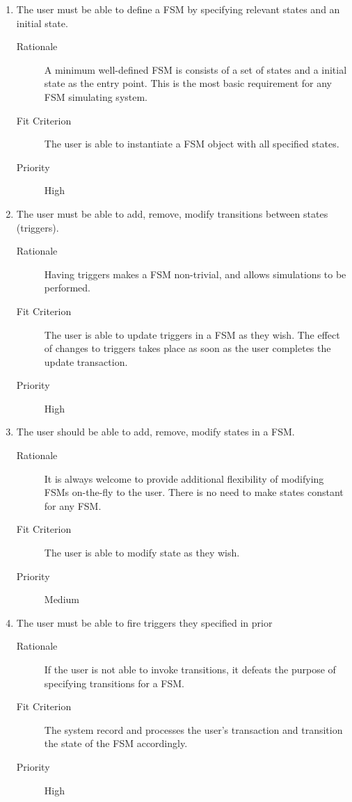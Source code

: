 \documentclass[12pt, titlepage]{article}
\begin{document}
\begin{enumerate}[{FR}1.]
\item The user must be able to define a FSM by specifying relevant states and an
  initial state.
  \begin{description}
  \item[Rationale] A minimum well-defined FSM is consists of a set of states and a
    initial state as the entry point. This is the most basic requirement for any
    FSM simulating system.
  \item[Fit Criterion] The user is able to instantiate a FSM object with all
    specified states.
  \item[Priority] High
  \end{description}
\item The user must be able to add, remove, modify transitions between states
  (triggers).
  \begin{description}
  \item[Rationale] Having triggers makes a FSM non-trivial, and allows simulations
    to be performed.
  \item[Fit Criterion] The user is able to update triggers in a FSM as they wish.
    The effect of changes to triggers takes place as soon as the user completes
    the update transaction.
  \item[Priority] High
  \end{description}
\item The user should be able to add, remove, modify states in a FSM.
  \begin{description}
  \item[Rationale] It is always welcome to provide additional flexibility of
    modifying FSMs on-the-fly to the user. There is no need to make states
    constant for any FSM.
  \item[Fit Criterion] The user is able to modify state as they wish.
  \item[Priority] Medium
  \end{description}
\item The user must be able to fire triggers they specified in prior
  \begin{description}
  \item[Rationale] If the user is not able to invoke transitions, it defeats the
    purpose of specifying transitions for a FSM.
  \item[Fit Criterion] The system record and processes the user's transaction and
    transition the state of the FSM accordingly.
  \item[Priority] High

\end{description}
\end{enumerate}
\end{document}
